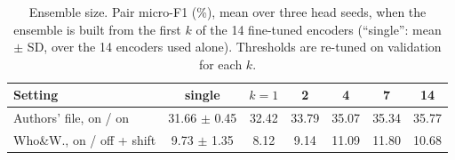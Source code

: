 \begin{table}[t]
\caption{Ensemble size. Pair micro-F1 (\%), mean over three head seeds, when the ensemble is built from the first $k$ of the 14 fine-tuned encoders (``single'': mean $\pm$ SD, over the 14 encoders used alone). Thresholds are re-tuned on validation for each $k$.}
\label{tab:ensize}
\centering\footnotesize\setlength{\tabcolsep}{2pt}
\begin{tabular}{@{}lcccccc@{}}
\toprule
Setting & single & $k{=}1$ & 2 & 4 & 7 & 14 \\
\midrule
Authors' file, on / on & 31.66 $\pm$ 0.45 & 32.42 & 33.79 & 35.07 & 35.34 & 35.77 \\
Who\&W., on / off + shift & 9.73 $\pm$ 1.35 & 8.12 & 9.14 & 11.09 & 11.80 & 10.68 \\
\bottomrule
\end{tabular}
\end{table}
